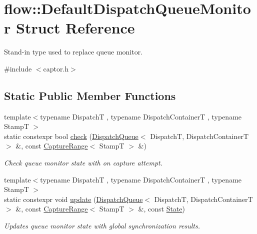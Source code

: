 \hypertarget{structflow_1_1_default_dispatch_queue_monitor}{}\section{flow\+:\+:Default\+Dispatch\+Queue\+Monitor Struct Reference}
\label{structflow_1_1_default_dispatch_queue_monitor}


Stand-\/in type used to replace queue monitor.  




{\ttfamily \#include $<$captor.\+h$>$}

\subsection*{Static Public Member Functions}
\begin{DoxyCompactItemize}
\item 
{\footnotesize template$<$typename DispatchT , typename Dispatch\+ContainerT , typename StampT $>$ }\\static constexpr bool \hyperlink{structflow_1_1_default_dispatch_queue_monitor_aed3f0234eeb6d3c60043d9d36047301a}{check} (\hyperlink{classflow_1_1_dispatch_queue}{Dispatch\+Queue}$<$ DispatchT, Dispatch\+ContainerT $>$ \&, const \hyperlink{structflow_1_1_capture_range}{Capture\+Range}$<$ StampT $>$ \&)
\begin{DoxyCompactList}\small\item\em Check queue monitor state with on capture attempt. \end{DoxyCompactList}\item 
{\footnotesize template$<$typename DispatchT , typename Dispatch\+ContainerT , typename StampT $>$ }\\static constexpr void \hyperlink{structflow_1_1_default_dispatch_queue_monitor_acccd20e4a17462c3d8d14e0aa26d1982}{update} (\hyperlink{classflow_1_1_dispatch_queue}{Dispatch\+Queue}$<$ DispatchT, Dispatch\+ContainerT $>$ \&, const \hyperlink{structflow_1_1_capture_range}{Capture\+Range}$<$ StampT $>$ \&, const \hyperlink{namespaceflow_adefe9726e597eb50c46f0f6a202018e9}{State})
\begin{DoxyCompactList}\small\item\em Updates queue monitor state with global synchronization results. \end{DoxyCompactList}\end{DoxyCompactItemize}


